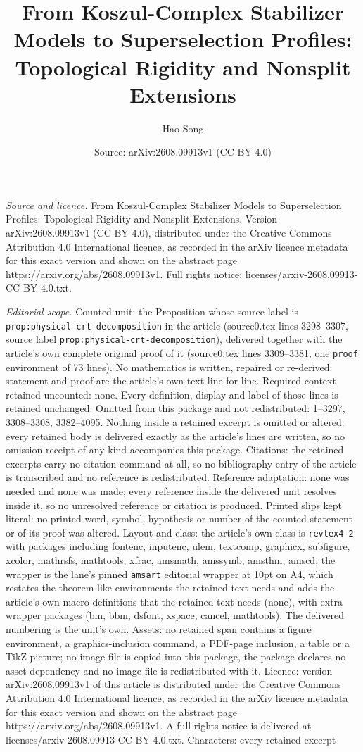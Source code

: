 \documentclass[10pt,a4paper]{amsart}
\title[From Koszul-Complex Stabilizer Models to Superselection Prof]{From Koszul-Complex Stabilizer Models to Superselection Profiles: Topological Rigidity and Nonsplit Extensions}
\author{Hao Song}
\date{Source: arXiv:2608.09913v1 (CC BY 4.0)}
\begin{document}
\maketitle

\noindent\emph{Source and licence.} From Koszul-Complex Stabilizer Models to Superselection Profiles: Topological Rigidity and Nonsplit Extensions. Version arXiv:2608.09913v1 (CC BY 4.0), distributed under the Creative Commons Attribution 4.0 International licence, as recorded in the arXiv licence metadata for this exact version and shown on the abstract page https://arxiv.org/abs/2608.09913v1. Full rights notice: licenses/arxiv-2608.09913-CC-BY-4.0.txt.\par\smallskip

\noindent\textit{Editorial scope.} Counted unit: the Proposition whose source label is \texttt{prop:physical-crt-decomposition} in the article (source0.tex lines 3298--3307, source label \texttt{prop:physical-crt-decomposition}), delivered together with the article's own complete original proof of it (source0.tex lines 3309--3381, one \texttt{proof} environment of 73 lines). No mathematics is written, repaired or re-derived: statement and proof are the article's own text line for line. Required context retained uncounted: none. Every definition, display and label of those lines is retained unchanged. Omitted from this package and not redistributed: 1--3297, 3308--3308, 3382--4095. Nothing inside a retained excerpt is omitted or altered: every retained body is delivered exactly as the article's lines are written, so no omission receipt of any kind accompanies this package. Citations: the retained excerpts carry no citation command at all, so no bibliography entry of the article is transcribed and no reference is redistributed. Reference adaptation: none was needed and none was made; every reference inside the delivered unit resolves inside it, so no unresolved reference or citation is produced. Printed slips kept literal: no printed word, symbol, hypothesis or number of the counted statement or of its proof was altered. Layout and class: the article's own class is \texttt{revtex4-2} with packages including fontenc, inputenc, ulem, textcomp, graphicx, subfigure, xcolor, mathrsfs, mathtools, xfrac, amsmath, amssymb, amsthm, amscd; the wrapper is the lane's pinned \texttt{amsart} editorial wrapper at 10pt on A4, which restates the theorem-like environments the retained text needs and adds the article's own macro definitions that the retained text needs (none), with extra wrapper packages (bm, bbm, dsfont, xspace, cancel, mathtools). The delivered numbering is the unit's own. Assets: no retained span contains a figure environment, a graphics-inclusion command, a PDF-page inclusion, a table or a TikZ picture; no image file is copied into this package, the package declares no asset dependency and no image file is redistributed with it. Licence: version arXiv:2608.09913v1 of this article is distributed under the Creative Commons Attribution 4.0 International licence, as recorded in the arXiv licence metadata for this exact version and shown on the abstract page https://arxiv.org/abs/2608.09913v1. A full rights notice is delivered at licenses/arxiv-2608.09913-CC-BY-4.0.txt. Characters: every retained excerpt 
\end{document}
